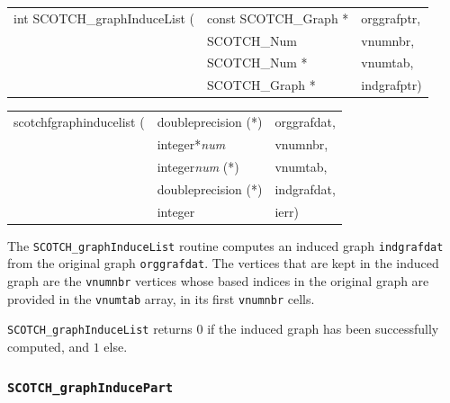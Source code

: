 \begin{itemize}
\progsyn

{\tt\begin{tabular}{l@{}ll}
int SCOTCH\_graphInduceList ( & const SCOTCH\_Graph * & orggrafptr, \\
                              & SCOTCH\_Num           & vnumnbr,    \\
                              & SCOTCH\_Num *         & vnumtab,    \\
                              & SCOTCH\_Graph *       & indgrafptr)
\end{tabular}}

{\tt\begin{tabular}{l@{}ll}
scotchfgraphinducelist ( & doubleprecision (*)   & orggrafdat, \\
                         & integer*{\it num}     & vnumnbr,    \\
                         & integer{\it num} (*)  & vnumtab,    \\
                         & doubleprecision (*)   & indgrafdat, \\
                         & integer               & ierr)

\end{tabular}}

\progdes

The {\tt SCOTCH\_graphInduceList} routine computes an induced graph
\texttt{indgrafdat} from the original graph \texttt{orggrafdat}. The
vertices that are kept in the induced graph are the \texttt{vnumnbr}
vertices whose based indices in the original graph are provided in the
\texttt{vnumtab} array, in its first \texttt{vnumnbr} cells.

\progret

{\tt SCOTCH\_graphInduceList} returns $0$ if the induced graph has
been successfully computed, and $1$ else.
\end{itemize}

\subsubsection{{\tt SCOTCH\_graphInducePart}}

